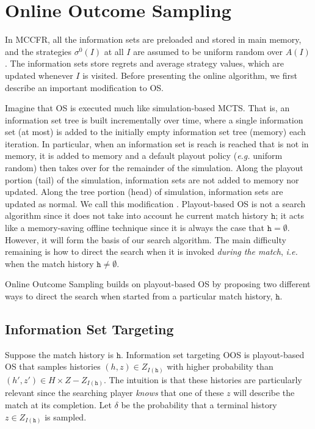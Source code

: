 \documentclass[letterpaper]{article}
\newcommand{\tth}{\mathtt{h}}
\newcommand{\defword}[1]{\textbf{\boldmath{#1}}}
\newcommand{\ie}{{\it i.e.}\xspace}
\newcommand{\eg}{{\it e.g.}\xspace}
\begin{document}
\section{Online Outcome Sampling}


In MCCFR, all the information sets are preloaded and stored in main memory, and
the strategies $\sigma^0(I)$ at all $I$ are assumed to be uniform random over $A(I)$. The information sets store regrets and average strategy 
values, which are updated whenever $I$ is visited. Before presenting the online algorithm, we first describe an important modification to OS.

Imagine that OS is executed much like simulation-based MCTS. That is, an information set tree is built incrementally over 
time, where a single information set (at most) is added to the initially empty information set tree (memory) each iteration. In 
particular, when an information set is reach is reached that is not in memory, it is added to memory and a default playout policy 
(\eg uniform random) then takes over for the remainder of the simulation. Along the playout portion (tail) of the simulation,  
information sets are not added to memory nor updated. Along the tree portion (head) of simulation, information sets are updated as normal. 
We call this modification \defword{playout-based outcome sampling}. 
Playout-based OS is not a search algorithm since it does not take into account he current match history $\tth$; 
it acts like a memory-saving offline technique since it is always the case that $\tth = \emptyset$.
However, it will form the basis of our search algorithm. 
The main difficulty remaining is how to direct the search when it is invoked {\it during the match}, 
\ie when the match history $\tth \not= \emptyset$. 

Online Outcome Sampling builds on playout-based OS by proposing two different ways to direct the search when started from a particular
match history, $\tth$. 

\subsection{Information Set Targeting}

Suppose the match history is $\tth$. Information set targeting OOS is playout-based OS that samples histories $(h,z) \in Z_{I(\tth)}$ 
with higher probability than $(h',z') \in H \times Z - Z_{I(\tth)}$. The intuition is that these histories are particularly 
relevant since the searching player {\it knows} that one of these $z$ will describe the match at its completion. Let $\delta$ be 
the probability that a terminal history $z \in Z_{I(\tth)}$ is sampled.
\end{document}
